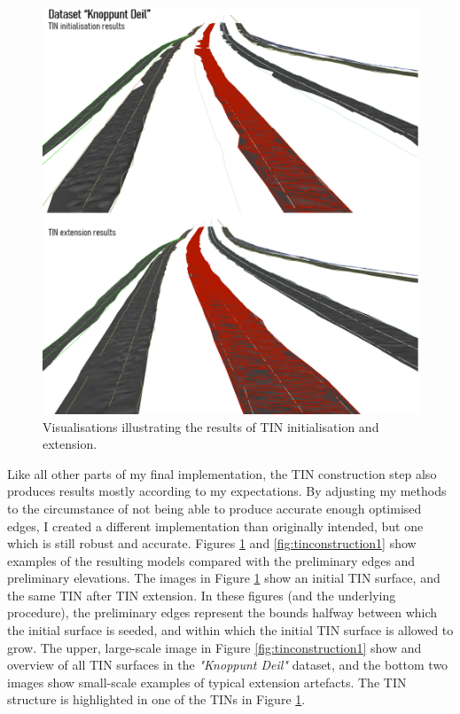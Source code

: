 \begin{figure}
    \centering
    \includegraphics[width=0.9\linewidth]{final_report/figs/tinconstruction0.png}
    \caption{Visualisations illustrating the results of TIN initialisation and extension.}
    \label{fig:tinconstruction0}
\end{figure}

Like all other parts of my final implementation, the TIN construction step also produces results mostly according to my expectations. By adjusting my methods to the circumstance of not being able to produce accurate enough optimised edges, I created a different implementation than originally intended, but one which is still robust and accurate. Figures \ref{fig:tinconstruction0} and \ref{fig:tinconstruction1} show examples of the resulting models compared with the preliminary edges and preliminary elevations. The images in Figure \ref{fig:tinconstruction0} show an initial TIN surface, and the same TIN after TIN extension. In these figures (and the underlying procedure), the preliminary edges represent the bounds halfway between which the initial surface is seeded, and within which the initial TIN surface is allowed to grow. The upper, large-scale image in Figure \ref{fig:tinconstruction1} show and overview of all TIN surfaces in the \textit{"Knoppunt Deil"} dataset, and the bottom two images show small-scale examples of typical extension artefacts. The TIN structure is highlighted in one of the TINs in Figure \ref{fig:tinconstruction0}.

